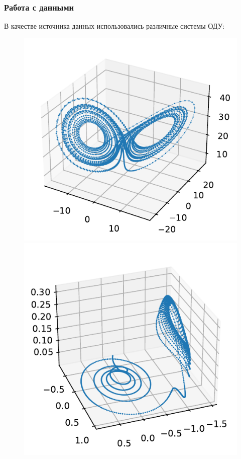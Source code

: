 \documentclass[pdf, hyperref={unicode}, aspectratio=169]{beamer}
\begin{document}
\begin{frame}
\frametitle{Работа с данными}

В качестве источника данных использовались различные системы ОДУ:
\begin{figure}
\includegraphics[height=0.38\textheight]{img/lorenz}\hfill
\includegraphics[height=0.38\textheight]{img/fabrab}\hfill

\end{figure}
\end{frame}
\end{document}
